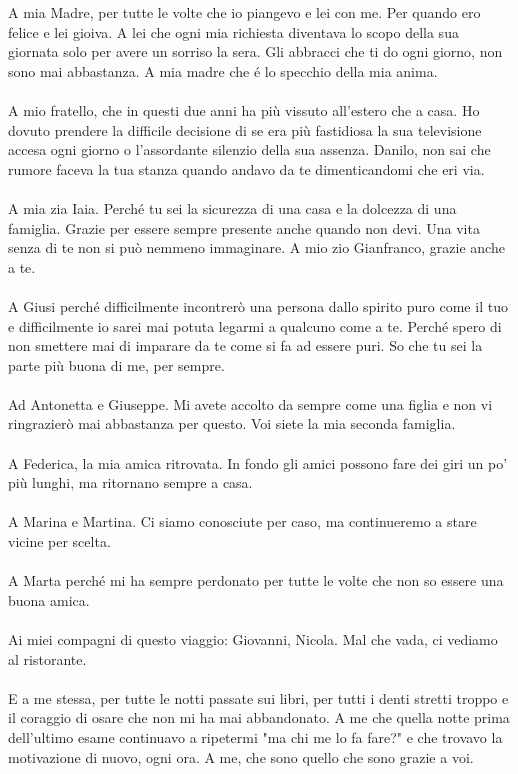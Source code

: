 A mia Madre, per tutte le volte che io piangevo e lei con me. Per quando ero felice e lei gioiva. A lei che ogni mia richiesta diventava lo scopo della sua giornata solo per avere un sorriso la sera. Gli abbracci che ti do ogni giorno, non sono mai abbastanza. A mia madre che é lo specchio della mia anima.\\\\
A mio fratello, che in questi due anni ha più vissuto all'estero che a casa. Ho dovuto prendere la difficile decisione di se era più fastidiosa la sua televisione accesa ogni giorno o l'assordante silenzio della sua assenza. Danilo, non sai che rumore faceva la tua stanza quando andavo da te dimenticandomi che eri via.\\\\
A mia zia Iaia. Perché tu sei la sicurezza di una casa e la dolcezza di una famiglia. Grazie per essere sempre presente anche quando non devi. Una vita senza di te non si può nemmeno immaginare. A mio zio Gianfranco, grazie anche a te.\\\\
A Giusi perché difficilmente incontrerò una persona dallo spirito puro come il tuo e difficilmente io sarei mai potuta legarmi a qualcuno come a te. Perché spero di non smettere mai di imparare da te come si fa ad essere puri. So che tu sei la parte più buona di me, per sempre.\\\\
Ad Antonetta e Giuseppe. Mi avete accolto da sempre come una figlia e non vi ringrazierò mai abbastanza per questo. Voi siete la mia seconda famiglia.\\\\
A Federica, la mia amica ritrovata. In fondo gli amici possono fare dei giri un po’ più lunghi, ma ritornano sempre a casa.\\\\
A Marina e Martina. Ci siamo conosciute per caso, ma continueremo a stare vicine per scelta.\\\\
A Marta perché mi ha sempre perdonato per tutte le volte che non so essere una buona amica.\\\\
Ai miei compagni di questo viaggio: Giovanni, Nicola. Mal che vada, ci vediamo al ristorante.\\\\
E a me stessa, per tutte le notti passate sui libri, per tutti i denti stretti troppo e il coraggio di osare che non mi ha mai abbandonato. A me che quella notte prima dell'ultimo esame continuavo a ripetermi "ma chi me lo fa fare?" e che trovavo la motivazione di nuovo, ogni ora. A me, che sono quello che sono grazie a voi.




